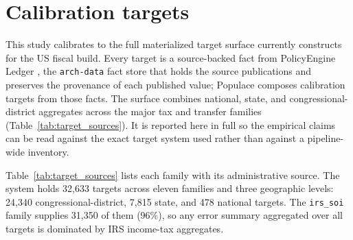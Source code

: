 \appendix

\section{Calibration targets}
\label{app:targets}

This study calibrates to the full materialized target surface \populace{} currently constructs for the
US fiscal build. Every target is a source-backed fact from PolicyEngine Ledger \citep{ledger2026}, the
\texttt{arch-data} fact store that holds the source publications and preserves the provenance of each
published value; Populace composes calibration targets from those facts. The surface combines national,
state, and congressional-district aggregates across the major tax and transfer families
(Table~\ref{tab:target_sources}). It is reported here in full so the empirical claims can be read against
the exact target system used rather than against a pipeline-wide inventory.

Table~\ref{tab:target_sources} lists each family with its administrative source. The system holds
32{,}633 targets across eleven families and three geographic levels: 24{,}340 congressional-district,
7{,}815 state, and 478 national targets. The \texttt{irs\_soi} family supplies 31{,}350 of them (96\%),
so any error summary aggregated over all targets is dominated by IRS income-tax aggregates.

